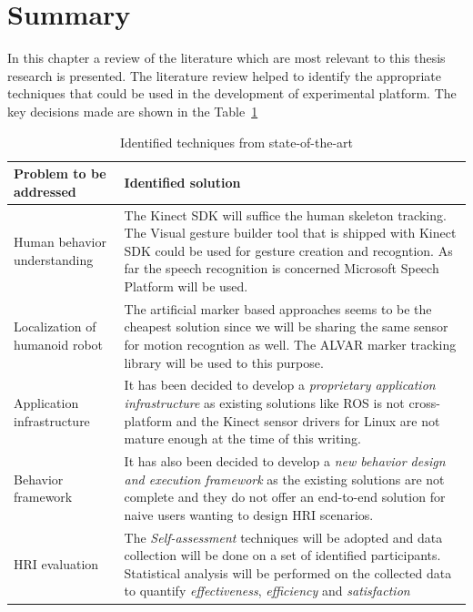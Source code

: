 \section{Summary}
In this chapter a review of the literature which are most relevant to this thesis research is presented. The literature review helped to identify the appropriate techniques that could be used in the development of experimental platform. The key decisions made are shown in the Table~\ref{table:review_decisions}

\begin{table}[H]
\centering
\small
\caption{Identified techniques from state-of-the-art}
\label{table:review_decisions}
\begin{tabular}{ | l | p{10cm} |}
\hline
  \textbf{Problem to be addressed} & \textbf{Identified solution}
  \tabularnewline \hline
  
  Human behavior understanding & The Kinect SDK \cite{KinectSDK2014} will suffice the human skeleton tracking. The Visual gesture builder tool that is shipped with Kinect SDK could be used for gesture creation and recogntion. As far the speech recognition is concerned Microsoft Speech Platform \cite{SpeechSdk} will be used.
                                          \tabularnewline\hline
                                          
  Localization of humanoid robot & The artificial marker based approaches seems to be the cheapest solution since we will be sharing the same sensor for motion recogntion as well. The ALVAR marker tracking library \cite{ALVAR} will be used to this purpose. 
                                          \tabularnewline\hline
  
  Application infrastructure & It has been decided to develop a \emph{proprietary application infrastructure} as existing solutions like ROS \cite{quigley2009ros} is not cross-platform and the Kinect sensor drivers for Linux are not mature enough at the time of this writing.
                                          \tabularnewline\hline

  Behavior framework & It has also been decided to develop a \emph{new behavior design and execution framework} as the existing solutions are not complete and they do not offer an end-to-end solution for naive users wanting to design HRI scenarios.
                                          \tabularnewline\hline

  HRI evaluation & The \emph{Self-assessment} techniques will be adopted and data collection will be done on a set of identified participants. Statistical analysis will be performed on the collected data to quantify \emph{effectiveness}, \emph{efficiency} and \emph{satisfaction}
                                          \tabularnewline\hline
\end{tabular}
\end{table}